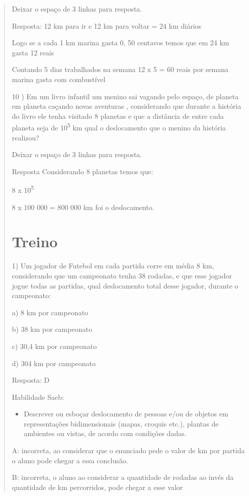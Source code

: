 \begin{quote}
\begin{escolha}
Deixar o espaço de 3 linhas para resposta.

Resposta: 12 km para ir e 12 km para voltar = 24 km diários

Logo se a cada 1 km marina gasta 0, 50 centavos temos que em 24 km gasta
12 reais

Contando 5 dias trabalhados na semana 12 x 5 = 60 reais por semana
marina gasta com combustível

10 ) Em um livro infantil um menino sai vagando pelo espaço, de planeta
em planeta caçando novas aventuras , considerando que durante a história
do livro ele tenha visitado 8 planetas e que a distância de entre cada
planeta seja de 10\textsuperscript{5} km qual o deslocamento que o
menino da história realizou?

Deixar o espaço de 3 linhas para resposta.

Resposta Considerando 8 planetas temos que:

8 x 10\textsuperscript{5}

8 x 100 000 = 800 000 km foi o deslocamento.

\section{Treino}

1) Um jogador de Futebol em cada partida corre em média 8 km,
considerando que um campeonato tenha 38 rodadas, e que esse jogador
jogue todas as partidas, qual deslocamento total desse jogador, durante
o campeonato:

a) 8 km por campeonato

b) 38 km por campeonato

c) 30,4 km por campeonato

d) 304 km por campeonato

Resposta: D

Habilidade Saeb:

\begin{itemize}
\tightlist
\item
  Descrever ou esboçar deslocamento de pessoas e/ou de objetos em
  representações bidimensionais (mapas, croquis etc.), plantas de
  ambientes ou vistas, de acordo com condições dadas.
\end{itemize}

A: incorreta, ao considerar que o enunciado pede o valor de km por
partida o aluno pode chegar a essa conclusão.

B: incorreta, o aluno ao considerar a quantidade de rodadas ao invés da
quantidade de km percorridos, pode chegar a esse valor


\end{escolha}
\end{quote}
